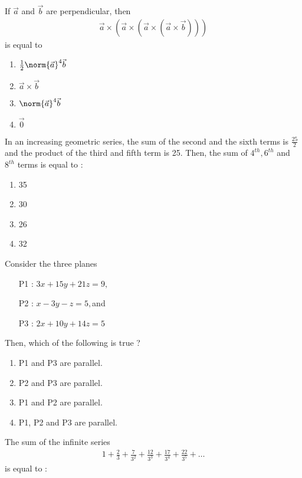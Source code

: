 	\item If $\vec{a}$ and $\vec{b}$ are perpendicular, then 
	\begin{align*}
		\vec{a} \times \left(\vec{a} \times \left(\vec{a} \times \left(\vec{a} \times \vec{b}\right)\right)\right)
	\end{align*}
	is equal to 
		\hfill{}
		\begin{enumerate}
			\item $\frac{1}{2}\norm{\vec{a}}^4 \vec{b}$ 
			\item $\vec{a} \times \vec{b}$ 
			\item $\norm{\vec{a}}^4 \vec{b}$  
			\item $\vec{0}$
		\end{enumerate}
	\item
		In an increasing geometric series, the sum of the second and the sixth terms is $\frac{25}{2}$
		and the product of the third and fifth term is 25. Then, the sum of $4^{th}, 6^{th}$ and $8^{th}$ terms
		is equal to :
		\hfill{}
		\begin{multicols}{4}
		\begin{enumerate}
			\item 35 \columnbreak
			\item 30 \columnbreak
			\item 26 \columnbreak
			\item 32
		\end{enumerate}
	\end{multicols}
	\item Consider the three planes
		\begin{enumerate}
			\item[P1 :] $3x + 15y + 21z = 9,$
			\item[P2 :] $x - 3y - z = 5, $and 
			\item[P3 :] $2x + 10y + 14z = 5$
		\end{enumerate}
		Then, which of the following is true ?	
		\hfill{}
		\begin{enumerate}
			\item P1 and P3 are parallel. 
			\item P2 and P3 are parallel. 
			\item P1 and P2 are parallel. 
			\item P1, P2 and P3 are parallel.
		\end{enumerate}
\item
	The sum of the infinite series
	\begin{align}
		1 + \frac{2}{3} + \frac{7}{3^2} + \frac{12}{3^3} + \frac{17}{3^4} + \frac{22}{3^5} + \dots
	\end{align} is equal to :
